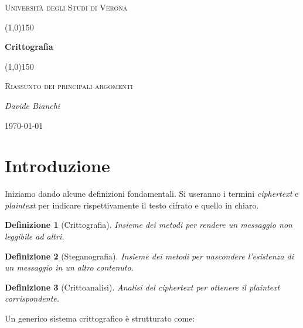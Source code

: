 \documentclass[a4paper, 11pt]{article}
\newtheorem{definit}{Definizione}[subsection]
\begin{document}
	\clearpage
	\begin{titlepage}
		\centering
		\vspace*{\fill}
		{\scshape\LARGE Università degli Studi di Verona \par}
		\vspace{1.5cm}
		\line(1,0){150} \\
		{\huge\bfseries Crittografia\par}
		\line(1,0){150} \\
		\vspace{0.5cm}
		{\scshape\Large Riassunto dei principali argomenti\par}
		\vspace{2cm}
		{\Large\itshape Davide Bianchi\par}
		\vspace{1cm}
		\vspace{5cm}
		\vspace*{\fill}
		{\large \today\par}
	\end{titlepage}
	\thispagestyle{empty}
	\newpage
	\tableofcontents
	\newpage
	
	\section{Introduzione}
	Iniziamo dando alcune definizioni fondamentali. Si useranno i termini \textit{ciphertext} e \textit{plaintext} per indicare rispettivamente il testo cifrato e quello in chiaro.
	
	\begin{definit}[Crittografia]
		Insieme dei metodi per rendere un messaggio non leggibile ad altri.
	\end{definit}
	
	\begin{definit}[Steganografia]
		Insieme dei metodi per nascondere l'esistenza di un messaggio in un altro contenuto.
	\end{definit}
	
	\begin{definit}[Crittoanalisi]
		Analisi del ciphertext per ottenere il plaintext corrispondente.
	\end{definit}
	
	Un generico sistema crittografico è strutturato come: \\
	
	
\end{document}
